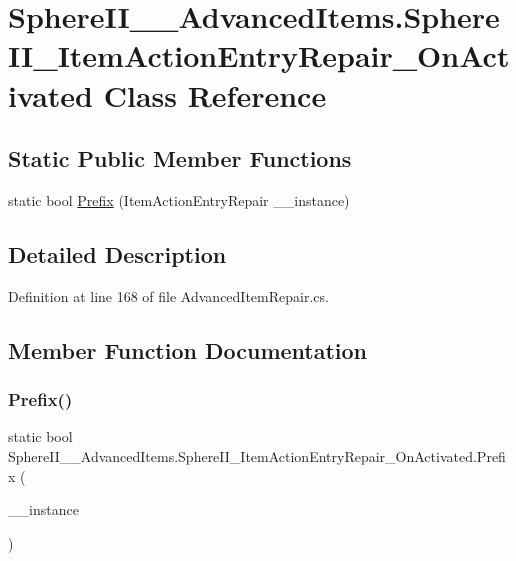 \hypertarget{class_sphere_i_i_____advanced_items_1_1_sphere_i_i___item_action_entry_repair___on_activated}{}\section{Sphere\+I\+I\+\_\+\+\_\+\+Advanced\+Items.\+Sphere\+I\+I\+\_\+\+Item\+Action\+Entry\+Repair\+\_\+\+On\+Activated Class Reference}
\label{class_sphere_i_i_____advanced_items_1_1_sphere_i_i___item_action_entry_repair___on_activated}
\subsection*{Static Public Member Functions}
\begin{DoxyCompactItemize}
\item 
static bool \mbox{\hyperlink{class_sphere_i_i_____advanced_items_1_1_sphere_i_i___item_action_entry_repair___on_activated_a77d155797d222f6fa2f5c00c965941ec}{Prefix}} (Item\+Action\+Entry\+Repair \+\_\+\+\_\+instance)
\end{DoxyCompactItemize}


\subsection{Detailed Description}


Definition at line 168 of file Advanced\+Item\+Repair.\+cs.



\subsection{Member Function Documentation}
\mbox{\label{class_sphere_i_i_____advanced_items_1_1_sphere_i_i___item_action_entry_repair___on_activated_a77d155797d222f6fa2f5c00c965941ec}} 
\subsubsection{\texorpdfstring{Prefix()}{Prefix()}}
{\footnotesize\ttfamily static bool Sphere\+I\+I\+\_\+\+\_\+\+Advanced\+Items.\+Sphere\+I\+I\+\_\+\+Item\+Action\+Entry\+Repair\+\_\+\+On\+Activated.\+Prefix (\begin{DoxyParamCaption}\item[{Item\+Action\+Entry\+Repair}]{\+\_\+\+\_\+instance }\end{DoxyParamCaption})\hspace{0.3cm}{\ttfamily [static]}}



